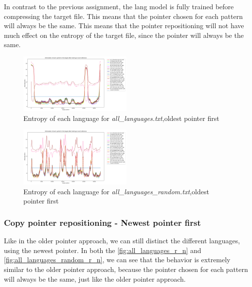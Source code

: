 \documentclass{article}
\begin{document}
In contrast to the previous assignment, the lang model is fully trained before compressing the target file. This means that the pointer chosen for each pattern will always be the same.
This means that the pointer repositioning will not have much effect on the entropy of the target file, since the pointer will always be the same.

\begin{figure}
    \centering
    \includegraphics[width=0.5\textwidth]{../results/all_languages/-r_o.png}
    \caption{Entropy of each language for \textit{all\_languages.txt},oldest pointer first}
    \label{fig:all_languages_r_o}
\end{figure}

\begin{figure}
    \centering
    \includegraphics[width=0.5\textwidth]{../results/all_languages_random/-r_o.png}
    \caption{Entropy of each language for \textit{all\_languages\_random.txt},oldest pointer first}
    \label{fig:all_languages_random_r_o}
\end{figure}

\subsubsection{Copy pointer repositioning - Newest pointer first}
\label{subsubsec:results_locate_lang_newest_pointer_first}

Like in the older pointer approach, we can still distinct the different languages, using the newest pointer.
In both the \ref{fig:all_languages_r_n} and \ref{fig:all_languages_random_r_n}, we can see that the behavior is extremely similar to the older pointer approach,
because the pointer chosen for each pattern will always be the same, just like the older pointer approach.
\end{document}
